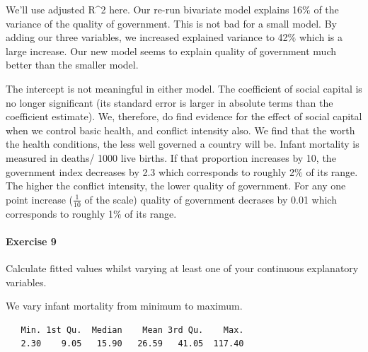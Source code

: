 \documentclass[]{article}
\newenvironment{Shaded}{\begin{snugshade}}{\end{snugshade}}
\newcommand{\KeywordTok}[1]{\textcolor[rgb]{0.13,0.29,0.53}{\textbf{#1}}}
\newcommand{\DataTypeTok}[1]{\textcolor[rgb]{0.13,0.29,0.53}{#1}}
\newcommand{\DecValTok}[1]{\textcolor[rgb]{0.00,0.00,0.81}{#1}}
\newcommand{\StringTok}[1]{\textcolor[rgb]{0.31,0.60,0.02}{#1}}
\newcommand{\CommentTok}[1]{\textcolor[rgb]{0.56,0.35,0.01}{\textit{#1}}}
\newcommand{\OperatorTok}[1]{\textcolor[rgb]{0.81,0.36,0.00}{\textbf{#1}}}
\newcommand{\NormalTok}[1]{#1}
\let\oldparagraph\paragraph
\renewcommand{\paragraph}[1]{\oldparagraph{#1}\mbox{}}
\theoremstyle{definition}
\theoremstyle{definition}
\theoremstyle{definition}
\theoremstyle{remark}
\begin{document}
We'll use adjusted R\^{}2 here. Our re-run bivariate model explains
16\(\%\) of the variance of the quality of government. This is not bad
for a small model. By adding our three variables, we increased explained
variance to 42\(\%\) which is a large increase. Our new model seems to
explain quality of government much better than the smaller model.

The intercept is not meaningful in either model. The coefficient of
social capital is no longer significant (its standard error is larger in
absolute terms than the coefficient estimate). We, therefore, do find
evidence for the effect of social capital when we control basic health,
and conflict intensity also. We find that the worth the health
conditions, the less well governed a country will be. Infant mortality
is measured in deaths/ 1000 live births. If that proportion increases by
10, the government index decreases by 2.3 which corresponds to roughly
2\(\%\) of its range. The higher the conflict intensity, the lower
quality of government. For any one point increase (\(\frac{1}{10}\) of
the scale) quality of government decrases by 0.01 which corresponds to
roughly 1\(\%\) of its range.

\paragraph{Exercise 9}\label{exercise-9-5}

Calculate fitted values whilst varying at least one of your continuous
explanatory variables.

We vary infant mortality from minimum to maximum.

\begin{Shaded}
\end{Shaded}

\begin{verbatim}
   Min. 1st Qu.  Median    Mean 3rd Qu.    Max. 
   2.30    9.05   15.90   26.59   41.05  117.40 
\end{verbatim}

\begin{Shaded}
\end{Shaded}
\end{document}
